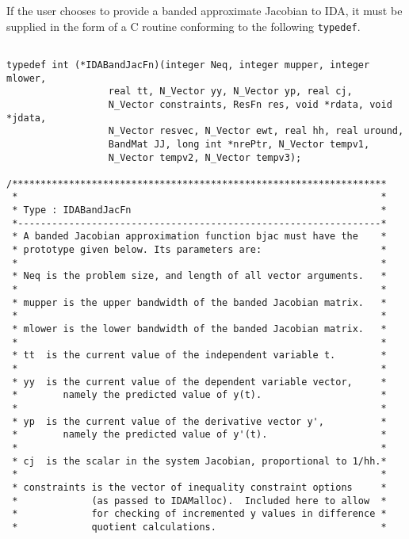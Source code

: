 \documentclass[11pt]{article}
\begin{document}
If the user chooses to provide a banded approximate Jacobian to IDA,
it must be supplied in the form of a C routine conforming to the
following {\tt typedef}.

\small
\begin{verbatim}
  
typedef int (*IDABandJacFn)(integer Neq, integer mupper, integer mlower,
                  real tt, N_Vector yy, N_Vector yp, real cj, 
                  N_Vector constraints, ResFn res, void *rdata, void *jdata, 
                  N_Vector resvec, N_Vector ewt, real hh, real uround, 
                  BandMat JJ, long int *nrePtr, N_Vector tempv1,
                  N_Vector tempv2, N_Vector tempv3);
 
/******************************************************************
 *                                                                *           
 * Type : IDABandJacFn                                            *
 *----------------------------------------------------------------*
 * A banded Jacobian approximation function bjac must have the    *
 * prototype given below. Its parameters are:                     *
 *                                                                *
 * Neq is the problem size, and length of all vector arguments.   *
 *                                                                *
 * mupper is the upper bandwidth of the banded Jacobian matrix.   *
 *                                                                *
 * mlower is the lower bandwidth of the banded Jacobian matrix.   *
 *                                                                *
 * tt  is the current value of the independent variable t.        *
 *                                                                *
 * yy  is the current value of the dependent variable vector,     *
 *        namely the predicted value of y(t).                     *
 *                                                                *
 * yp  is the current value of the derivative vector y',          *
 *        namely the predicted value of y'(t).                    *
 *                                                                *
 * cj  is the scalar in the system Jacobian, proportional to 1/hh.*
 *                                                                *
 * constraints is the vector of inequality constraint options     *
 *             (as passed to IDAMalloc).  Included here to allow  *
 *             for checking of incremented y values in difference *
 *             quotient calculations.                             *

\end{verbatim}
\end{document}
